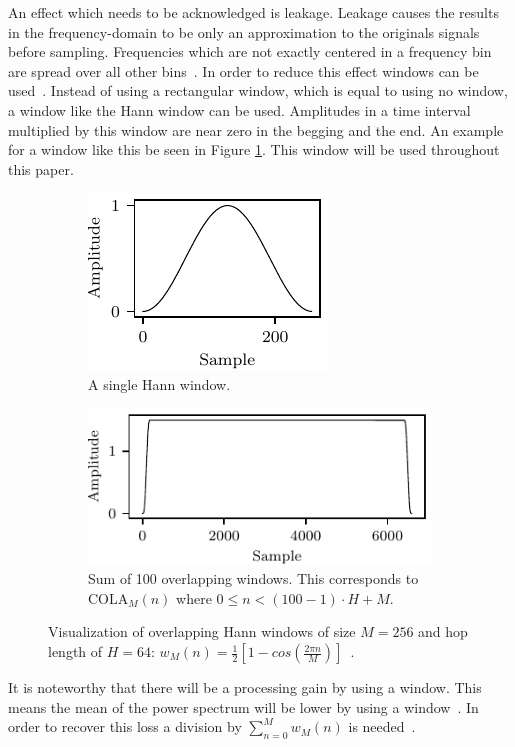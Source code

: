 An effect which needs to be acknowledged is leakage. Leakage causes the results in the frequency-domain to be only an approximation to the originals signals before sampling. Frequencies which are not exactly centered in a frequency bin are spread over all other bins~\cite[p.~71]{Lyons1997}. In order to reduce this effect windows can be used~\cite[p.~80]{Lyons1997}. Instead of using a rectangular window, which is equal to using no window, a window like the Hann window can be used. Amplitudes in a time interval multiplied by this window are near zero in the begging and the end. An example for a window like this be seen in Figure \ref{fig.hann}. This window will be used throughout this paper.
\begin{figure}
	\begin{subfigure}[t]{0.30\textwidth}
		\centering
		\includegraphics{figure/hann.pdf}
		\caption{A single Hann window.}
		\label{fig.hann}
	\end{subfigure}\quad
	\begin{subfigure}[t]{0.60\textwidth}
		\centering
		\includegraphics{figure/window_sumsquare.pdf}
		\caption{Sum of 100 overlapping windows. This corresponds to $\mathrm{COLA}_M(n)$ where $0\le n < (100-1) \cdot H + M$.}
		\label{fig.hann-summed}
	\end{subfigure}%
	\caption{Visualization of overlapping Hann windows of size $M=256$ and hop length of $H=64$: $w_M(n)=\frac{1}{2}[1-cos(\frac{2\pi n}{M})]$~\cite{Harris1978}.}
\end{figure}
It is noteworthy that there will be a processing gain by using a window. This means the mean of the power spectrum will be lower by using a window~\cite[p.~83]{Lyons1997}. In order to recover this loss a division by $\sum_{n=0}^{M}w_M(n)$ is needed~\cite[p.~15]{Heinzel2002}.

